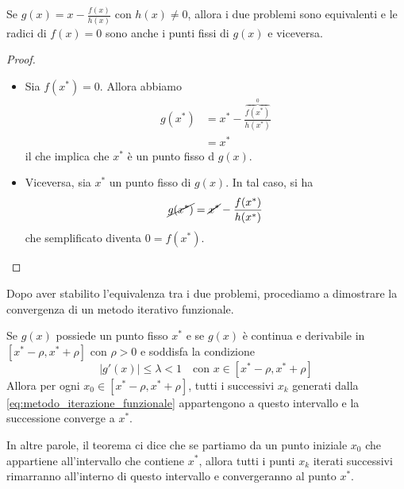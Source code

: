 \documentclass{article}
\begin{document}
Se $g(x)=x-\frac{f(x)}{h(x)}$ con $h(x)\neq0$, allora i due problemi sono
equivalenti e le radici di $f(x)=0$ sono anche i punti fissi di $g(x)$ e
viceversa.
\begin{proof}\leavevmode\
    \begin{itemize}
        \item Sia $f(x^*)=0$. Allora abbiamo
            \begin{equation*}
               \begin{aligned}
                   g(x^*)&=x^*-\frac{\overbrace{f(x^*)}^0}{h(x^*)}\\ 
                         &=x^*
               \end{aligned} 
            \end{equation*}
            il che implica che $x^*$ è un punto fisso d $g(x)$.
        \item Viceversa, sia $x^*$ un punto fisso di $g(x)$. In tal caso, si
            ha 
            $$\cancel{g(x^*)}=\cancel{x^*}-\frac{f(x^*)}{h(x^*)}$$
            che semplificato diventa $0=f(x^*)$.
    \end{itemize}
\end{proof}
Dopo aver stabilito l'equivalenza tra i due problemi, procediamo a dimostrare
la convergenza di un metodo iterativo funzionale.
\begin{theorem}
   Se $g(x)$ possiede un punto fisso $x^*$ e se $g(x)$ è continua e derivabile
   in $[x^*-\rho,x^*+\rho]$ con $\rho>0$ e soddisfa la condizione 
   $$\left\lvert g'(x)\right\rvert\leq \lambda<1\quad \text{con
   }x\in[x^*-\rho,x^*+\rho]$$
   Allora per ogni $x_0\in[x^*-\rho,x^*+\rho]$, tutti i successivi $x_k$
   generati dalla \ref{eq:metodo_iterazione_funzionale} appartengono 
   a questo intervallo e la successione converge a $x^*$.
\end{theorem}
In altre parole, il teorema ci dice che se partiamo da un punto iniziale $x_0$
che appartiene all'intervallo che contiene $x^*$, allora tutti i punti $x_k$
iterati successivi rimarranno all'interno di questo intervallo e convergeranno
al punto $x^*$.
\end{document}
